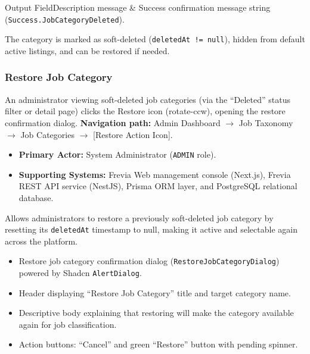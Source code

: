 \begin{specdatatable}{Output Field}{Description}
message & Success confirmation message string (\texttt{Success.JobCategoryDeleted}).\\ \hline
\end{specdatatable}

\noindent The category is marked as soft-deleted (\texttt{deletedAt != null}), hidden from default active listings, and can be restored if needed.

\subsubsection{ Restore Job Category}

An administrator viewing soft-deleted job categories (via the ``Deleted'' status filter or detail page) clicks the Restore icon (rotate-ccw), opening the restore confirmation dialog.\newline
\textbf{Navigation path:} Admin Dashboard $\rightarrow$ Job Taxonomy $\rightarrow$ Job Categories $\rightarrow$ [Restore Action Icon].


\begin{itemize}[leftmargin=1.6em,topsep=3pt,itemsep=2pt,parsep=0pt,label=$\bullet$]
    \item \textbf{Primary Actor:} System Administrator (\texttt{ADMIN} role).
    \item \textbf{Supporting Systems:} Frevia Web management console (Next.js), Frevia REST API service (NestJS), Prisma ORM layer, and PostgreSQL relational database.
\end{itemize}

\noindent Allows administrators to restore a previously soft-deleted job category by resetting its \texttt{deletedAt} timestamp to null, making it active and selectable again across the platform.

\begin{itemize}[leftmargin=1.6em,topsep=3pt,itemsep=2pt,parsep=0pt,label=$\bullet$]
    \item Restore job category confirmation dialog (\texttt{RestoreJobCategoryDialog}) powered by Shadcn \texttt{AlertDialog}.
    \item Header displaying ``Restore Job Category'' title and target category name.
    \item Descriptive body explaining that restoring will make the category available again for job classification.
    \item Action buttons: ``Cancel'' and green ``Restore'' button with pending spinner.
\end{itemize}

